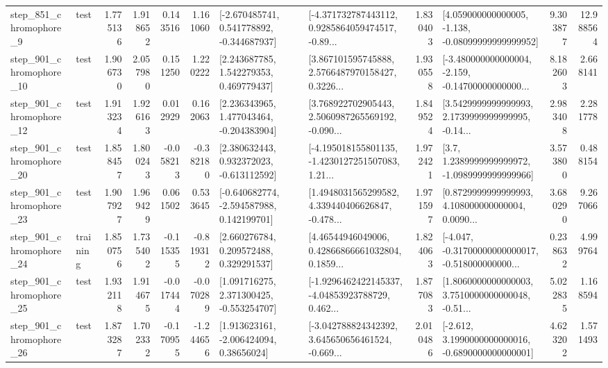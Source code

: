 \begin{tabular}{llrrrrllrlrr}
   step\_851\_chromophore\_9 &      test &      1.775136 &    1.918652 &      0.143516 &  1.161060 &   [-2.670485741, 0.541778892, -0.344687937] &  [-4.371732787443112, 0.9285864059474517, -0.89... &       1.830403 &  [4.059000000000005, -1.138, -0.08099999999999952] &            9.303877 &         12.988564 \\
  step\_901\_chromophore\_10 &      test &      1.906730 &    2.057980 &      0.151250 &  1.220222 &     [2.243687785, 1.542279353, 0.469779437] &  [3.867101595745888, 2.5766487970158427, 0.3226... &       1.930558 &  [-3.480000000000004, -2.159, -0.14700000000000... &            8.182603 &          2.668141 \\
  step\_901\_chromophore\_12 &      test &      1.913234 &    1.926163 &      0.012929 &  0.162063 &    [2.236343965, 1.477043464, -0.204383904] &  [3.768922702905443, 2.5060987265569192, -0.090... &       1.849524 &  [3.5429999999999993, 2.1739999999999995, -0.14... &            2.983408 &          2.281778 \\
  step\_901\_chromophore\_20 &      test &      1.858457 &    1.800243 &     -0.058213 & -0.382180 &    [2.380632443, 0.932372023, -0.613112592] &  [-4.195018155801135, -1.4230127251507083, 1.21... &       1.972421 &     [3.7, 1.2389999999999972, -1.0989999999999966] &            3.573800 &          0.488154 \\
  step\_901\_chromophore\_23 &      test &      1.907927 &    1.969429 &      0.061502 &  0.533645 &   [-0.640682774, -2.594587988, 0.142199701] &  [1.4948031565299582, 4.339440406626847, -0.478... &       1.971597 &  [0.8729999999999993, 4.108000000000004, 0.0090... &            3.680290 &          9.267066 \\
  step\_901\_chromophore\_24 &  training &      1.850756 &    1.735402 &     -0.115355 & -0.819312 &     [2.660276784, 0.209572488, 0.329291537] &  [4.46544946049006, 0.42866866661032804, 0.1859... &       1.824063 &  [-4.047, -0.31700000000000017, -0.518000000000... &            0.238632 &          4.999764 \\
  step\_901\_chromophore\_25 &      test &      1.932118 &    1.914675 &     -0.017444 & -0.070289 &    [1.091716275, 2.371300425, -0.553254707] &  [-1.9296462422145337, -4.04853923788729, 0.462... &       1.877083 &  [1.8060000000000003, 3.7510000000000048, -0.51... &            5.022835 &          1.168594 \\
  step\_901\_chromophore\_26 &      test &      1.873287 &    1.702332 &     -0.170955 & -1.244656 &     [1.913623161, -2.006424094, 0.38656024] &  [-3.042788824342392, 3.645650656461524, -0.669... &       2.010486 &  [-2.612, 3.1990000000000016, -0.6890000000000001] &            4.623202 &          1.571493 \\

\end{tabular}
